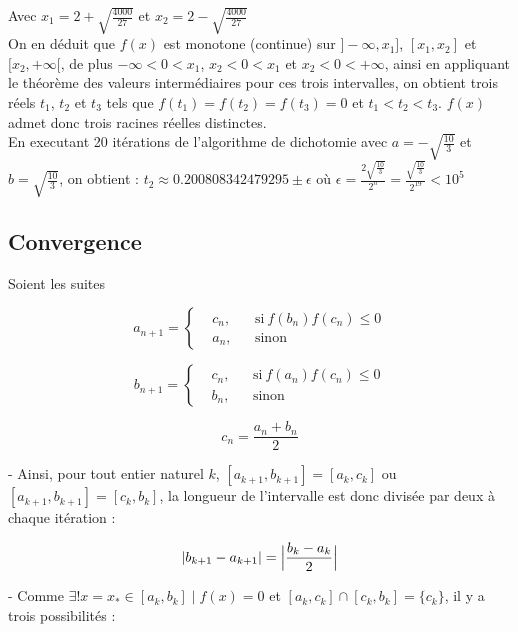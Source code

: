 \documentclass{article}
\DeclarePairedDelimiter\abs{\lvert}{\rvert}%
\DeclarePairedDelimiter\bigabs{\Big\lvert}{\Big\rvert}%
\begin{document}
Avec $x_1 = 2 + \sqrt{\frac{4000}{27}}$ et $x_2 = 2 - \sqrt{\frac{4000}{27}}$\\


On en déduit que $f(x)$ est monotone (continue) sur $]-\infty, x_1]$,
$[x_1, x_2]$ et $[x_2, +\infty[$, de plus $-\infty < 0 < x_1$, $x_2 < 0 < x_1$ et $x_2 < 0 < +\infty$,
ainsi en appliquant le théorème des valeurs intermédiaires pour ces trois intervalles, on obtient trois réels
$t_1$, $t_2$ et $t_3$ tels que $f(t_1) = f(t_2) = f(t_3) = 0$ et $t_1 < t_2 < t_3$. $f(x)$ admet donc trois racines
réelles distinctes.\\


En executant 20 itérations de l'algorithme de dichotomie avec $a = -\sqrt{\frac{10}{3}}$ et
$b = \sqrt{\frac{10}{3}}$, on obtient :
$t_2 \approx 0.200808342479295 \pm \epsilon$ où $\epsilon = \frac{2\sqrt{\frac{10}{3}}}{2^n} =
\frac{\sqrt{\frac{10}{3}}}{2^{19}} < 10^{5}$

\subsection{Convergence}

Soient les suites

\begin{equation*}
    a_{n+1}=\left \{
    \begin{aligned}
      &c_n, && \text{si}\ f(b_n)f(c_n) \leq 0 \\
      &a_n, && \text{sinon}
    \end{aligned} \right.
\end{equation*} 
  
\begin{equation*}
    b_{n+1}=\left \{
    \begin{aligned}
      &c_n, && \text{si}\ f(a_n)f(c_n) \leq 0 \\
      &b_n, && \text{sinon}
    \end{aligned} \right.
\end{equation*} 

$$c_n = \frac{a_{n} + b_{n}}{2}$$

- Ainsi, pour tout entier naturel $k$, $[a_{k + 1}, b_{k + 1}] =
[a_k, c_k]$ ou $[a_{k + 1}, b_{k + 1}] = [c_k, b_k]$, la longueur de 
l'intervalle est donc divisée par deux à chaque itération : 

$$\abs{b_{k + 1} - a_{k + 1}} = \bigabs{\frac{b_k - a_k}{2}}$$

- Comme $\exists! x = x_* \in [a_k, b_k] \mid f(x) = 0$ et $[a_k, c_k] \cap [c_k, b_k] = \{c_k\}$, il y a trois
possibilités :
\end{document}
